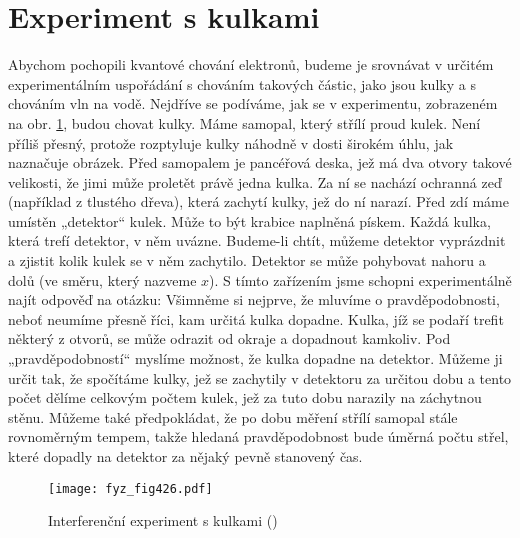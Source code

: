   \section{Experiment s kulkami}\label{fyz:IchapXXXVIIsecII}
    Abychom pochopili kvantové chování elektronů, budeme je srovnávat v určitém experimentálním
    uspořádání s chováním takových částic, jako jsou kulky a s chováním vln na vodě. Nejdříve se
    podíváme, jak se v experimentu, zobrazeném na obr. \ref{fyz:fig426}, budou chovat kulky. Máme
    samopal, který střílí proud kulek. Není příliš přesný, protože rozptyluje kulky náhodně v dosti
    širokém úhlu, jak naznačuje obrázek. Před samopalem je pancéřová deska, jež má dva otvory takové
    velikosti, že jimi může proletět právě jedna kulka. Za ní se nachází ochranná zeď (například z
    tlustého dřeva), která zachytí kulky, jež do ní narazí. Před zdí máme umístěn „detektor“ kulek.
    Může to být krabice naplněná pískem. Každá kulka, která trefí detektor, v něm uvázne. Budeme-li
    chtít, můžeme detektor vyprázdnit a zjistit kolik kulek se v něm zachytilo. Detektor se může
    pohybovat nahoru a dolů (ve směru, který nazveme \(x\)). S tímto zařízením jsme schopni
    experimentálně najít odpověď na otázku:  Všimněme si
    nejprve, že mluvíme o pravděpodobnosti, neboť neumíme přesně říci, kam určitá kulka dopadne.
    Kulka, jíž se podaří trefit některý z otvorů, se může odrazit od okraje a dopadnout kamkoliv. Pod
    „pravděpodobností“ myslíme možnost, že kulka dopadne na detektor. Můžeme ji určit tak, že
    spočítáme kulky, jež se zachytily v detektoru za určitou dobu a tento počet dělíme celkovým
    počtem kulek, jež za tuto dobu narazily na záchytnou stěnu. Můžeme také předpokládat, že po dobu
    měření střílí samopal stále rovnoměrným tempem, takže hledaná pravděpodobnost bude úměrná počtu
    střel, které dopadly na detektor za nějaký pevně stanovený čas.
    
    \begin{figure}[ht!] %
      \centering
      \texttt{[image: fyz\_fig426.pdf]}
      \caption{Interferenční experiment s kulkami (\cite[s.~697]{Feynman01})}
      \label{fyz:fig426}
    \end{figure}

